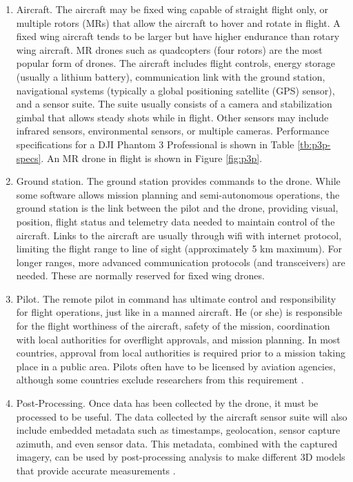 \begin{enumerate}
\item Aircraft. The aircraft may be fixed wing capable of straight flight only, or multiple rotors (MRs) that allow the aircraft to hover and rotate in flight. A fixed wing aircraft tends to be larger but have higher endurance than rotary wing aircraft. MR drones such as quadcopters (four rotors) are the most popular form of drones. The aircraft includes flight controls, energy storage (usually a lithium battery), communication link with the ground station, navigational systems (typically a global positioning satellite (GPS) sensor), and a sensor suite. The suite usually consists of a camera and stabilization gimbal that allows steady shots while in flight. Other sensors may include infrared sensors, environmental sensors, or multiple cameras. Performance specifications for a DJI Phantom 3 Professional is shown in Table \ref{tb:p3p-specs}. An MR drone in flight is shown in Figure \ref{fig:p3p}.

\item Ground station. The ground station provides commands to the drone. While some software allows mission planning and semi-autonomous operations, the ground station is the link between the pilot and the drone, providing visual, position, flight status and telemetry data needed to maintain control of the aircraft. Links to the aircraft are usually through wifi with internet protocol, limiting the flight range to line of sight (approximately 5 km maximum). For longer ranges, more advanced communication protocols (and transceivers) are needed. These are normally reserved for fixed wing drones.

\item Pilot. The remote pilot in command has ultimate control and responsibility for flight operations, just like in a manned aircraft. He (or she) is responsible for the flight worthiness of the aircraft, safety of the mission, coordination with local authorities for overflight approvals, and mission planning. In most countries, approval from local authorities is required prior to a mission taking place in a public area. Pilots often have to be licensed by aviation agencies, although some countries exclude researchers from this requirement \citep{UAVCoach2017}.

\item Post-Processing. Once data has been collected by the drone, it must be processed to be useful. The data collected by the aircraft sensor suite will also include embedded metadata such as timestamps, geolocation, sensor capture azimuth, and even sensor data. This metadata, combined with the captured imagery, can be used by post-processing analysis to make different 3D models that provide accurate measurements \citep{Sona2014}. 

\end{enumerate}

